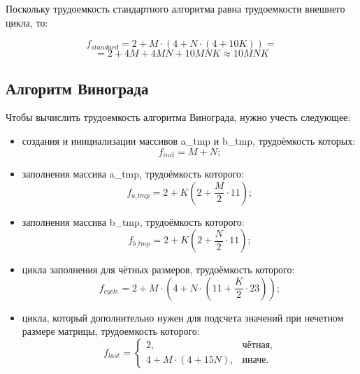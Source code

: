 Поскольку трудоемкость стандартного алгоритма равна трудоемкости внешнего цикла, то:

\begin{equation}
	\label{for:standard}
	f_{standard} = 2 + M \cdot (4 + N \cdot (4 + 10K)) =
\end{equation}
\begin{displaymath}
	= 2 + 4M + 4MN + 10MNK \approx 10MNK
\end{displaymath}


\subsection{Алгоритм Винограда}

Чтобы вычислить трудоемкость алгоритма Винограда, нужно учесть следующее: 

\begin{itemize}
	\item создания и инициализации массивов a\_tmp и b\_tmp, трудоёмкость которых:
	\begin{equation}
		\label{for:init}
		f_{init} = M + N;
	\end{equation}
	
	\item заполнения массива a\_tmp, трудоёмкость которого:
	\begin{equation}
		\label{for:ATMP}
		f_{a\_tmp} = 2 + K (2 + \frac{M}{2} \cdot 11);
	\end{equation}
	
	\item заполнения массива b\_tmp, трудоёмкость которого:
	\begin{equation}
		\label{for:BTMP}
		f_{b\_tmp} = 2 + K (2 + \frac{N}{2} \cdot 11);
	\end{equation}
	
	\item цикла заполнения для чётных размеров, трудоёмкость которого:
	\begin{equation}
		\label{for:cycle}
		f_{cycle} = 2 + M \cdot (4 + N \cdot (11 + \frac{K}{2} \cdot 23));
	\end{equation}
	
	\item цикла, который дополнительно нужен для подсчета значений при нечетном размере матрицы, трудоемкость которого:
	\begin{equation}
		\label{for:last}
		f_{last} = \begin{cases}
			2, & \text{чётная,}\\
			4 + M \cdot (4 + 15N), & \text{иначе.}
		\end{cases}
	\end{equation}
\end{itemize}

